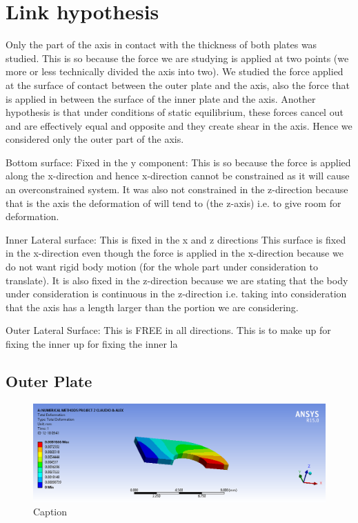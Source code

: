 \documentclass[a4paper 12pt]{article}
\begin{document}
\section{Link hypothesis}

Only the part of the axis in contact with the thickness of both plates was studied. This is so because the force we are studying is applied at two points (we more or less technically divided the axis into two). We studied the force applied at the surface of contact between the outer plate and the axis, also the force that is applied in between the surface of the inner plate and the axis. Another hypothesis is that under conditions of static equilibrium, these forces cancel out and are effectively equal and opposite and they create shear in the axis. Hence we considered only the outer part of the axis.
 
Bottom surface: Fixed in the y component:
This is so because the force is applied along the x-direction and hence x-direction cannot be constrained as it will cause an overconstrained system. It was also not constrained in the z-direction because that is the axis the deformation of will tend to (the z-axis) i.e. to give room for deformation.

Inner Lateral surface: This is fixed in the x and z directions
This surface is fixed in the x-direction even though the force is applied in the x-direction because we do not want rigid body motion (for the whole part under consideration to translate). It is also fixed in the z-direction because we are stating that the body under consideration is continuous in the z-direction i.e. taking into consideration that the axis has a length larger than the portion we are considering.


Outer Lateral Surface: This is FREE in all directions.
This is to make up for fixing the inner up for fixing the inner la


\subsection{Outer Plate}

\begin{figure}[!ht]
    \centering
    \includegraphics[width=1\textwidth]{images/OUTER_CHAIN_DEFORMATION.png}
    \caption{Caption}
    \label{fig:outer_deformation}
\end{figure}
\end{document}
